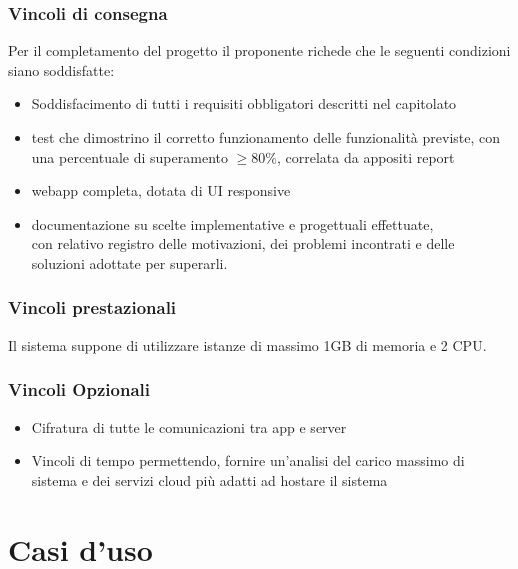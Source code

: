 \documentclass[12pt]{article}
\begin{document}
\subsubsection{Vincoli di consegna}
Per il completamento del progetto il proponente richede che le seguenti condizioni siano soddisfatte:
\begin{itemize}
	\item Soddisfacimento di tutti i requisiti obbligatori descritti nel capitolato
	\item test che dimostrino il corretto funzionamento delle funzionalità previste, con una percentuale di superamento \begin{math}\geq 80\% \end{math}, correlata da appositi report
	\item webapp completa, dotata di UI responsive
	\item documentazione su scelte implementative e progettuali effettuate,\\ con relativo registro delle motivazioni, dei problemi incontrati e delle soluzioni adottate per superarli.
\end{itemize}

\subsubsection{Vincoli prestazionali}
Il sistema suppone di utilizzare istanze di massimo 1GB di memoria e 2 CPU.

\subsubsection{Vincoli Opzionali}
\begin{itemize}
	\item Cifratura di tutte le comunicazioni tra app e server
	\item Vincoli di tempo permettendo, fornire un'analisi del carico massimo di sistema e dei servizi cloud più adatti ad hostare il sistema
\end{itemize}



\section{Casi d'uso}
\end{document}
